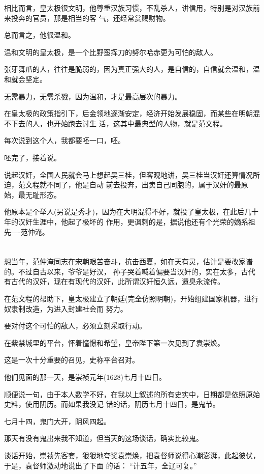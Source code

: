 \documentclass[11pt,a4paper,onecolumn]{article}
\begin{document}
相比而言，皇太极很文明，他尊重汉族习惯，不乱杀人，讲信用，特别是对汉族前来投奔的官员，那是相当的客
气，还经常赏赐财物。

总而言之，他很温和。

温和文明的皇太极，是一个比野蛮挥刀的努尔哈赤更为可怕的敌人。

张牙舞爪的人，往往是脆弱的，因为真正强大的人，是自信的，自信就会温和，温和就会坚定。

无需暴力，无需杀戮，因为温和，才是最高层次的暴力。

在皇太极的政策指引下，后金领地逐渐安定，经济开始发展稳固，而某些在明朝混不下去的人，也开始跑去讨生
活，这其中最典型的人物，就是范文程。

每次说到这个人，我都要呸一口，呸。

呸完了，接着说。

说起汉奸，全国人民就会马上想起吴三桂，但客观地讲，吴三桂当汉奸还算情况所迫，范文程就不同了，他是自动
前去投奔，出卖自己同胞的，属于汉奸的最原始，最无耻形态。

他原本是个举人(另说是秀才)，因为在大明混得不好，就投了皇太极，在此后几十年的汉奸生涯中，他起了极坏的
作用，更讽刺的是，据说他还有个光荣的嫡系祖先----范仲淹。

\section[\thesection]{}

想当年，范仲淹同志在宋朝艰苦奋斗，抗击西夏，如在天有灵，估计是要改家谱的。不过自古以来，爷爷是好汉，
孙子哭着喊着偏要当汉奸的，实在太多，古代有古代的汉奸，现在有现代的汉奸，此所谓汉奸恒久远，遗臭永流传。

在范文程的帮助下，皇太极建立了朝廷(完全仿照明朝)，开始组建国家机器，进行奴隶制改造，为进入封建社会而
努力。

要对付这个可怕的敌人，必须立刻采取行动。

在紫禁城里的平台，怀着憧憬和希望，皇帝陛下第一次见到了袁崇焕。

这是一次十分重要的召见，史称平台召对。

他们见面的那一天，是崇祯元年(1628)七月十四日。

顺便说一句，由于本人数学不好，在我以上叙述的所有史实中，日期都是依照原始史料，使用阴历。而如果我没记
错的话，阴历七月十四日，是鬼节。

七月十四，鬼门大开，阴风四起。

那天有没有鬼出来我不知道，但当天的这场谈话，确实比较鬼。

谈话开始，崇祯先客套，狠狠地夸奖袁崇焕，把袁督师说得心潮澎湃，此起彼伏，于是，袁督师激动地说出了下面
的话： ``计五年，全辽可复。''
\end{document}
